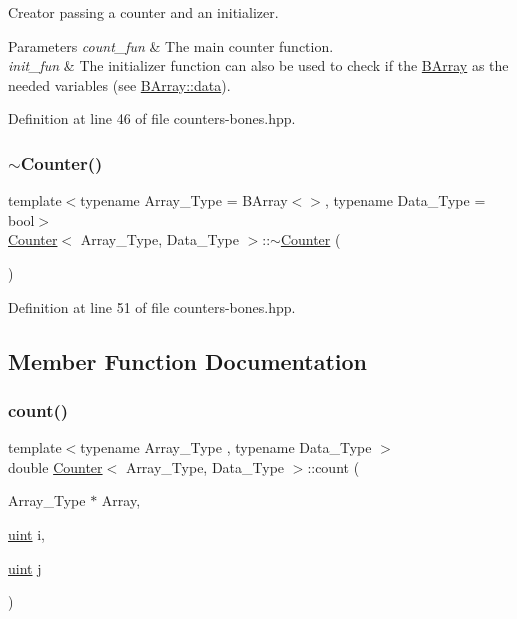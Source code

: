 Creator passing a counter and an initializer. 


\begin{DoxyParams}{Parameters}
{\em count\+\_\+fun} & The main counter function. \\
\hline
{\em init\+\_\+fun} & The initializer function can also be used to check if the {\ttfamily \hyperlink{class_b_array}{B\+Array}} as the needed variables (see \hyperlink{class_b_array_a9576163b52124021575e50dbcca2f6b9}{B\+Array\+::data}). \\
\hline
\end{DoxyParams}


Definition at line 46 of file counters-\/bones.\+hpp.

\mbox{\label{class_counter_a66594b4ffbbf337241b032c1f039b3c0}} 
\subsubsection{\texorpdfstring{$\sim$\+Counter()}{~Counter()}}
{\footnotesize\ttfamily template$<$typename Array\+\_\+\+Type = B\+Array$<$$>$, typename Data\+\_\+\+Type = bool$>$ \\
\hyperlink{class_counter}{Counter}$<$ Array\+\_\+\+Type, Data\+\_\+\+Type $>$\+::$\sim$\hyperlink{class_counter}{Counter} (\begin{DoxyParamCaption}{ }\end{DoxyParamCaption})\hspace{0.3cm}{\ttfamily [inline]}}



Definition at line 51 of file counters-\/bones.\+hpp.



\subsection{Member Function Documentation}
\mbox{\label{class_counter_afe1d23e72c3bdca9b2481f36ebde1d95}} 
\subsubsection{\texorpdfstring{count()}{count()}}
{\footnotesize\ttfamily template$<$typename Array\+\_\+\+Type , typename Data\+\_\+\+Type $>$ \\
double \hyperlink{class_counter}{Counter}$<$ Array\+\_\+\+Type, Data\+\_\+\+Type $>$\+::count (\begin{DoxyParamCaption}\item[{Array\+\_\+\+Type $\ast$}]{Array,  }\item[{\hyperlink{typedefs_8hpp_a91ad9478d81a7aaf2593e8d9c3d06a14}{uint}}]{i,  }\item[{\hyperlink{typedefs_8hpp_a91ad9478d81a7aaf2593e8d9c3d06a14}{uint}}]{j }\end{DoxyParamCaption})\hspace{0.3cm}{\ttfamily [inline]}}



